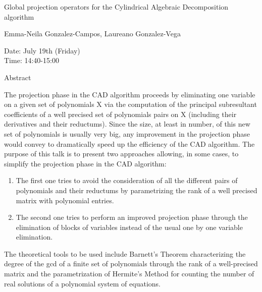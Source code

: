 \begin{center}
\LARGE
Global projection operators for the Cylindrical Algebraic
                   Decomposition algorithm

\end{center}

\begin{center}
\Large
Emma-Neila Gonzalez-Campos, 
                      Laureano Gonzalez-Vega

\end{center}

\noindent
Date:  July 19th (Friday)\\
Time:  14:40-15:00 \\

\begin{center}
\large
Abstract
\end{center}

The projection phase in the CAD algorithm proceeds by eliminating one variable on a given set of
polynomials X via the computation of the principal subresultant coefficients of a well precised set
of polynomials pairs on X (including their derivatives and their reductums). Since the size, at least
in number, of this new set of polynomials is usually very big, any improvement in the projection
phase would convey to dramatically speed up the efficiency of the CAD algorithm. The purpose of
this talk is to present two approaches allowing, in some cases, to simplify the projection phase in
the CAD algorithm: 
\begin{enumerate}
\item The first one tries to avoid the consideration of all the different pairs of polynomials and their
reductums by parametrizing the rank of a well precised matrix with polynomial entries. 
\item The second one tries to perform an improved projection phase through the elimination of blocks
of variables instead of the usual one by one variable elimination. 
\end{enumerate}
The theoretical tools to be used include Barnett's Theorem characterizing the degree of the gcd of
a finite set of polynomials through the rank of a well-precised matrix and the parametrization of
Hermite's Method for counting the number of real solutions of a polynomial system of equations. 

